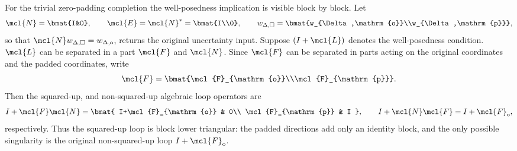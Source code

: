 
\begin{example}
For the trivial zero-padding completion the well-posedness implication is visible block by
block. Let
\begin{equation}
    \mcl{N}=\bmat{I&0},
    \qquad
    \mcl{E}=\mcl{N}^*=\bmat{I\\0},
    \qquad
    w_{\Delta,\square}=\bmat{w_{\Delta,\mathrm{o}}\\w_{\Delta,\mathrm{p}}},
\end{equation}
so that $\mcl{N}w_{\Delta,\square}=w_{\Delta,\mathrm{o}}$, returns the original uncertainty input. Suppose $(I +\mcl{L})$ denotes the 
well-posedness condition. $\mcl{L}$ can be separated in a part $\mcl{F}$ and $\mcl{N}$.
Since $\mcl{F}$ can be separated in parts acting on the original coordinates
and the padded coordinates, write
\begin{equation}
    \mcl{F}=\bmat{\mcl{F}_{\mathrm{o}}\\\mcl{F}_{\mathrm{p}}}.
\end{equation}
Then the squared-up, and non-squared-up algebraic loop operators are
\begin{equation}
    I+\mcl{F}\mcl{N}
    =
    \bmat{
        I+\mcl{F}_{\mathrm{o}} & 0\\
        \mcl{F}_{\mathrm{p}} & I
    },
    \qquad
    I+\mcl{N}\mcl{F}
    =
    I+\mcl{F}_{\mathrm{o}},
\end{equation}
respectively.
Thus the squared-up loop is block lower triangular: the padded directions add
only an identity block, and the only possible singularity is the original
non-squared-up loop $I+\mcl{F}_{\mathrm{o}}$.
\end{example}



